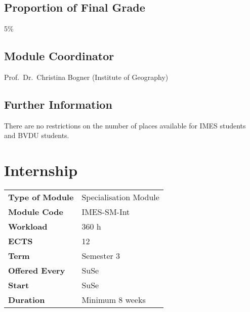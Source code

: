 \documentclass[
  letterpaper,
  10pt,
  openany]{book}
\begin{document}
\section*{Proportion of Final Grade}\label{proportion-of-final-grade-3}


5\%

\section*{Module Coordinator}\label{module-coordinator-3}


Prof.~Dr.~Christina Bogner (Institute of Geography)

\section*{Further Information}\label{further-information-3}


There are no restrictions on the number of places available for IMES
students and BVDU students.

\chapter*{Internship}\label{internship}


\begin{longtable}[]{@{}ll@{}}
\toprule\noalign{}
\endhead
\bottomrule\noalign{}
\endlastfoot
\textbf{Type of Module} & Specialisation Module \\
\textbf{Module Code} & IMES-SM-Int \\
\textbf{Workload} & 360 h \\
\textbf{ECTS} & 12 \\
\textbf{Term} & Semester 3 \\
\textbf{Offered Every} & SuSe \\
\textbf{Start} & SuSe \\
\textbf{Duration} & Minimum 8 weeks \\
\end{longtable}
\end{document}
